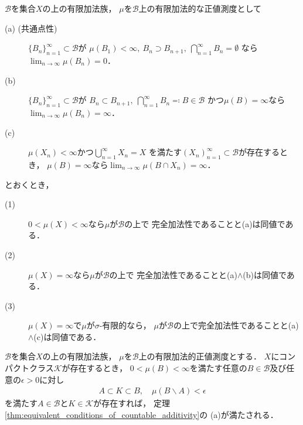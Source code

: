 		\begin{screen}
			\begin{thm}[完全加法性の同値条件]\label{thm:equivalent_conditions_of_countable_additivity}
				$\mathcal{B}$を集合$X$の上の有限加法族，
				$\mu$を$\mathcal{B}$上の有限加法的な正値測度として
				\begin{description}
					\item[(a) (共通点性)] $\{B_n\}_{n=1}^\infty \subset \mathcal{B}$が
						$\mu(B_1) < \infty,\ B_n \supset B_{n+1},\ \bigcap_{n=1}^\infty B_n = \emptyset$
						なら$\lim_{n \to \infty} \mu(B_n) = 0$．
						
					\item[(b)] $\{B_n\}_{n=1}^\infty \subset \mathcal{B}$が
						$B_n \subset B_{n+1},\ \bigcap_{n=1}^\infty B_n \eqqcolon B \in \mathcal{B}$
						かつ$\mu(B) = \infty$なら$\lim_{n \to \infty} \mu(B_n) = \infty$．
					
					\item[(c)] $\mu(X_n) < \infty$かつ$\bigcup_{n=1}^\infty X_n = X$
						を満たす$(X_n)_{n=1}^\infty \subset \mathcal{B}$が存在するとき，
						$\mu(B) = \infty$なら$\lim_{n \to \infty} \mu(B \cap X_n) = \infty$．
				\end{description}
				とおくとき，
				\begin{description}
					\item[(1)] $0 < \mu(X) < \infty$なら$\mu$が$\mathcal{B}$の上で
						完全加法性であることと(a)は同値である．
						
					\item[(2)] $\mu(X) = \infty$なら$\mu$が$\mathcal{B}$の上で
						完全加法性であることと(a)$\wedge$(b)は同値である．
						
					\item[(3)] $\mu(X) = \infty$で$\mu$が$\sigma$-有限的なら，
						$\mu$が$\mathcal{B}$の上で完全加法性であることと(a)$\wedge$(c)は同値である．
				\end{description}
			\end{thm}
		\end{screen}
		
		\begin{prf}
			
		\end{prf}
		
		\begin{screen}
			\begin{thm}[コンパクトクラスと共通点性]\label{thm:compact_class_intersection}
				$\mathcal{B}$を集合$X$の上の有限加法族，
				$\mu$を$\mathcal{B}$上の有限加法的正値測度とする．
				$X$にコンパクトクラス$\mathcal{K}$が存在するとき，
				$0 < \mu(B) < \infty$を満たす任意の$B \in \mathcal{B}$及び任意の$\epsilon > 0$に対し
				\begin{align}
					A \subset K \subset B,
					\quad \mu(B \backslash A) < \epsilon
				\end{align}
				を満たす$A \in \mathcal{B}$と$K \in \mathcal{K}$が存在すれば，
				定理\ref{thm:equivalent_conditions_of_countable_additivity}の
				(a)が満たされる．
			\end{thm}
		\end{screen}
		
